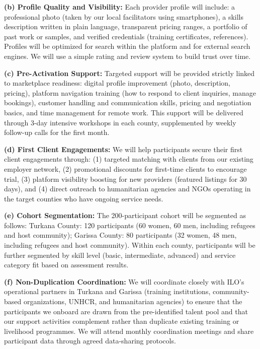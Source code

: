 \documentclass[11pt,a4paper]{article}
\begin{document}
\noindent \textbf{(b) Profile Quality and Visibility:} Each provider profile will include: a professional photo (taken by our local facilitators using smartphones), a skills description written in plain language, transparent pricing ranges, a portfolio of past work or samples, and verified credentials (training certificates, references). Profiles will be optimized for search within the platform and for external search engines. We will use a simple rating and review system to build trust over time.

\noindent \textbf{(c) Pre-Activation Support:} Targeted support will be provided strictly linked to marketplace readiness: digital profile improvement (photo, description, pricing), platform navigation training (how to respond to client inquiries, manage bookings), customer handling and communication skills, pricing and negotiation basics, and time management for remote work. This support will be delivered through 3-day intensive workshops in each county, supplemented by weekly follow-up calls for the first month.

\noindent \textbf{(d) First Client Engagements:} We will help participants secure their first client engagements through: (1) targeted matching with clients from our existing employer network, (2) promotional discounts for first-time clients to encourage trial, (3) platform visibility boosting for new providers (featured listings for 30 days), and (4) direct outreach to humanitarian agencies and NGOs operating in the target counties who have ongoing service needs.

\noindent \textbf{(e) Cohort Segmentation:} The 200-participant cohort will be segmented as follows: Turkana County: 120 participants (60 women, 60 men, including refugees and host community); Garissa County: 80 participants (32 women, 48 men, including refugees and host community). Within each county, participants will be further segmented by skill level (basic, intermediate, advanced) and service category fit based on assessment results.

\noindent \textbf{(f) Non-Duplication Coordination:} We will coordinate closely with ILO's operational partners in Turkana and Garissa (training institutions, community-based organizations, UNHCR, and humanitarian agencies) to ensure that the participants we onboard are drawn from the pre-identified talent pool and that our support activities complement rather than duplicate existing training or livelihood programmes. We will attend monthly coordination meetings and share participant data through agreed data-sharing protocols.
\end{document}
